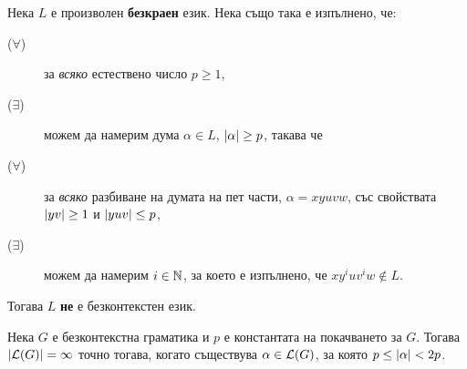 \begin{corollary}
  \label{cor:pumping-context-free}
  Нека $L$ е произволен {\bf безкраен} език. Нека също така е изпълнено, че:
  \begin{description}
  \item[($\forall$)]
    за {\em всяко} естествено число $p \geq 1$,
  \item[($\exists$)]
    можем да намерим дума $\alpha \in L$, $\vert{\alpha}\vert\geq p$, такава че
  \item[($\forall$)]
    за {\em всяко} разбиване на думата на пет части, $\alpha = xyuvw$, със свойствата $\vert{yv}\vert \geq 1$ и $\vert{yuv}\vert \leq p$,
  \item[($\exists$)]
    можем да намерим $i \in \mathbb{N}$, за което е изпълнено, че $xy^iuv^iw \not\in L$.
  \end{description}  
  Тогава $L$ {\bf не} е безконтекстен език.
\end{corollary}

\begin{corollary}
  Нека $G$ е безконтекстна граматика и $p$ е константата на покачването за $G$.
  Тогава $\vert{\mathcal{L}(G)}\vert = \infty$ точно тогава, когато съществува $\alpha \in \mathcal{L}(G)$, за която $p \leq \vert{\alpha}\vert < 2p$.
\end{corollary}



